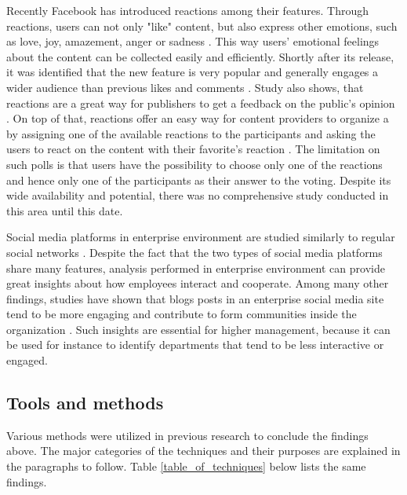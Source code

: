 Recently Facebook has introduced reactions among their features. Through reactions, users can not only "like" content, but also express other emotions, such as love, joy, amazement, anger or sadness \cite{shouldfacebookusereactions, howarenewspublishersreactingonfacebook}. This way users' emotional feelings about the content can be collected easily and efficiently. Shortly after its release, it was identified that the new feature is very popular and generally engages a wider audience than previous likes and comments \cite{shouldfacebookusereactions}. Study also shows, that reactions are a great way for publishers to get a feedback on the public's opinion \cite{howarenewspublishersreactingonfacebook}. On top of that, reactions offer an easy way for content providers to organize a by assigning one of the available reactions to the participants and asking the users to react on the content with their favorite's reaction \cite{shouldfacebookusereactions}. The limitation on such polls is that users have the possibility to choose only one of the reactions and hence only one of the participants as their answer to the voting. Despite its wide availability and potential, there was no comprehensive study conducted in this area until this date.

Social media platforms in enterprise environment are studied similarly to regular social networks \cite{guy2016whatsyourorganizationlike}. Despite the fact that the two types of social media platforms share many features, analysis performed in enterprise environment can provide great insights about how employees interact and cooperate. Among many other findings, studies have shown that blogs posts in an enterprise social media site tend to be more engaging and contribute to form communities inside the organization \cite{guy2016whatsyourorganizationlike}. Such insights are essential for higher management, because it can be used for instance to identify departments that tend to be less interactive or engaged.  

\subsection{Tools and methods}
Various methods were utilized in previous research to conclude the findings above. The major categories of the techniques and their purposes are explained in the paragraphs to follow. Table \ref{table_of_techniques} below lists the same findings.

